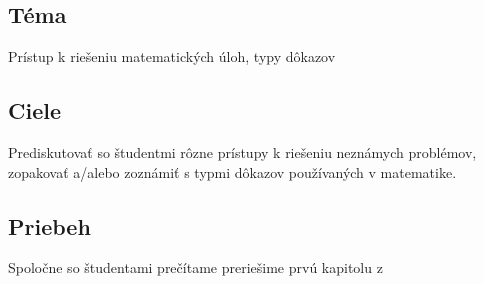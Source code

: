 
\subsection*{Téma}
Prístup k riešeniu matematických úloh, typy dôkazov

\subsection*{Ciele}
Prediskutovať so študentmi rôzne prístupy k riešeniu neznámych problémov, zopakovať a/alebo zoznámiť s typmi dôkazov používaných v matematike.

\subsection*{Priebeh}

Spoločne so študentami prečítame preriešime prvú kapitolu z~\cite{holton2010}
